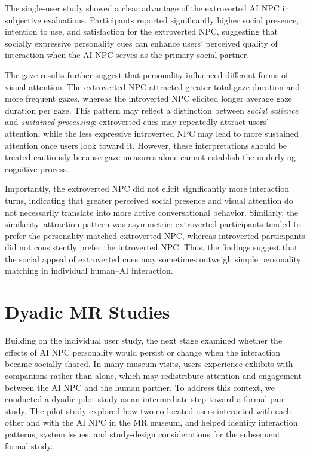 \documentclass[a4paper,fleqn]{cas-sc}
\begin{document}
The single-user study showed a clear advantage of the extroverted AI NPC in subjective evaluations. Participants reported significantly higher social presence, intention to use, and satisfaction for the extroverted NPC, suggesting that socially expressive personality cues can enhance users' perceived quality of interaction when the AI NPC serves as the primary social partner.

The gaze results further suggest that personality influenced different forms of visual attention. The extroverted NPC attracted greater total gaze duration and more frequent gazes, whereas the introverted NPC elicited longer average gaze duration per gaze. This pattern may reflect a distinction between \emph{social salience} and \emph{sustained processing}: extroverted cues may repeatedly attract users' attention, while the less expressive introverted NPC may lead to more sustained attention once users look toward it. However, these interpretations should be treated cautiously because gaze measures alone cannot establish the underlying cognitive process.

Importantly, the extroverted NPC did not elicit significantly more interaction turns, indicating that greater perceived social presence and visual attention do not necessarily translate into more active conversational behavior. Similarly, the similarity--attraction pattern was asymmetric: extroverted participants tended to prefer the personality-matched extroverted NPC, whereas introverted participants did not consistently prefer the introverted NPC. Thus, the findings suggest that the social appeal of extroverted cues may sometimes outweigh simple personality matching in individual human--AI interaction.

\section{Dyadic MR Studies}\label{sec:dyadic}

Building on the individual user study, the next stage examined whether the effects of AI NPC personality would persist or change when the interaction became socially shared. In many museum visits, users experience exhibits with companions rather than alone, which may redistribute attention and engagement between the AI NPC and the human partner. To address this context, we conducted a dyadic pilot study as an intermediate step toward a formal pair study. The pilot study explored how two co-located users interacted with each other and with the AI NPC in the MR museum, and helped identify interaction patterns, system issues, and study-design considerations for the subsequent formal study.
\end{document}
